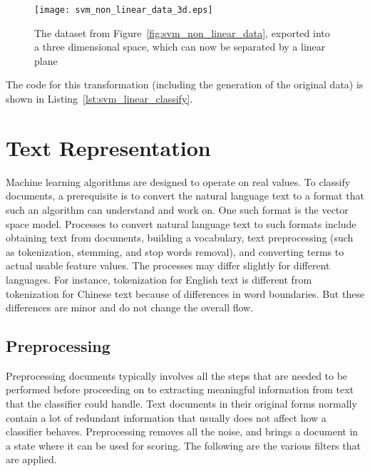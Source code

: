 \begin{figure}[t!]
    \centering
    \texttt{[image: svm\_non\_linear\_data\_3d.eps]}
    \caption{The dataset from Figure~\ref{fig:svm_non_linear_data}, exported into a three dimensional space, which can now be separated by a linear plane}
    \label{fig:svm_non_linear_data_3d}
\end{figure}

The code for this transformation (including the generation of the original data) is shown in Listing~\ref{lst:svm_linear_classify}.\\



\section{Text Representation}
Machine learning algorithms are designed to operate on real values. To classify documents, a prerequisite is to convert the natural language text to a format that such an algorithm can understand and work on. One such format is the vector space model. Processes to convert natural language text to such formats include obtaining text from documents, building a vocabulary, text preprocessing (such as tokenization, stemming, and stop words removal), and converting terms to actual usable feature values. The processes may differ slightly for different languages. For instance, tokenization for English text is different from tokenization for Chinese text because of differences in word boundaries. But these differences are minor and do not change the overall flow.

\subsection{Preprocessing}
Preprocessing documents typically involves all the steps that are needed to be performed before proceeding on to extracting meaningful information from text that the classifier could handle. Text documents in their original forms normally contain a lot of redundant information that usually does not affect how a classifier behaves. Preprocessing removes all the noise, and brings a document in a state where it can be used for scoring. The following are the various filters that are applied.

